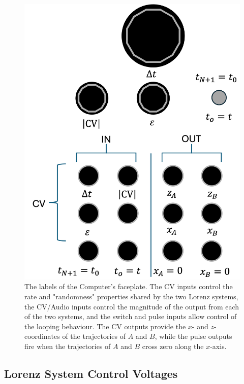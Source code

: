 \documentclass{tufte-handout}
\begin{document}
\begin{figure}[h]
  \includegraphics[width=\linewidth]{module_labels.png}%
  \caption{The labels of the Computer's faceplate. The CV inputs control the rate and "randomness" properties shared by the two Lorenz systems, the CV/Audio inputs control the magnitude of the output from each of the two systems, and the switch and pulse inputs allow control of the looping behaviour. The CV outputs provide the $x$- and $z$-coordinates of the trajectories of $A$ and $B$, while the pulse outputs fire when the trajectories of $A$ and $B$ cross zero along the $x$-axis.}%
  \label{fig:module_labels}%
\end{figure}

\subsection{Lorenz System Control Voltages}
\end{document}
